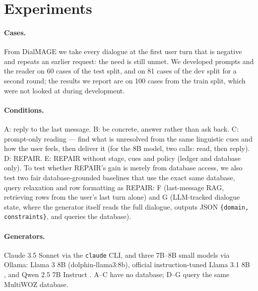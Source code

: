 \documentclass[11pt]{article}
\begin{document}
\section{Experiments}
\paragraph{Cases.} From DialMAGE we take every dialogue at the first user turn that is negative and repeats
an earlier request: the need is still unmet. We developed prompts and the reader on 60 cases of the test
split, and on 81 cases of the dev split for a second round; the results we report are on 100 cases from the
train split, which were not looked at during development.
\paragraph{Conditions.} A: reply to the last message. B: be concrete, answer rather than ask back.
C: prompt-only reading --- find what is unresolved from the same linguistic cues and how the user feels,
then deliver it (for the 8B model, two calls: read, then reply). D: REPAIR. E: REPAIR without stage, cues and
policy (ledger and database only). To test whether REPAIR's gain is merely from database access, we also test
two fair database-grounded baselines that use the exact same database, query relaxation and row formatting as
REPAIR: F (last-message RAG, retrieving rows from the user's last turn alone) and G (LLM-tracked dialogue
state, where the generator itself reads the full dialogue, outputs JSON \texttt{\{domain, constraints\}}, and
queries the database).
\paragraph{Generators.} Claude 3.5 Sonnet \citep{anthropic2024claude} via the
\texttt{claude} CLI, and three 7B--8B small models via Ollama: Llama 3 8B (dolphin-llama3:8b), official
instruction-tuned Llama 3.1 8B \citep[llama3.1:8b;][]{grattafiori2024llama3}, and Qwen 2.5 7B Instruct
\citep[qwen2.5:7b;][]{qwen2024qwen25}. A--C have no database; D--G
query the same MultiWOZ database.
\end{document}
